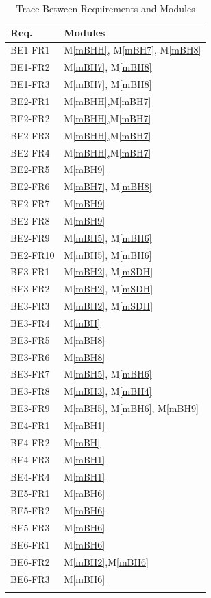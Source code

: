 \documentclass[12pt, titlepage]{article}
\newcommand{\mref}[1]{M\ref{#1}}
\begin{document}
\begin{table}[H]
\centering
\begin{tabular}{p{} p{}}
\toprule
\textbf{Req.} & \textbf{Modules}\\
\midrule
BE1-FR1 &  \mref{mBHH}, \mref{mBH7}, \mref{mBH8}\\
BE1-FR2 & \mref{mBH7}, \mref{mBH8}\\
BE1-FR3 &  \mref{mBH7}, \mref{mBH8}\\
BE2-FR1 & \mref{mBHH},\mref{mBH7}\\
BE2-FR2 & \mref{mBHH},\mref{mBH7}\\
BE2-FR3 & \mref{mBHH},\mref{mBH7}\\
BE2-FR4 & \mref{mBHH},\mref{mBH7}\\
BE2-FR5 & \mref{mBH9}\\
BE2-FR6 & \mref{mBH7}, \mref{mBH8}\\
BE2-FR7 & \mref{mBH9}\\
BE2-FR8 & \mref{mBH9} \\
BE2-FR9 & \mref{mBH5}, \mref{mBH6} \\
BE2-FR10 & \mref{mBH5}, \mref{mBH6} \\
BE3-FR1 & \mref{mBH2}, \mref{mSDH}\\
BE3-FR2 & \mref{mBH2}, \mref{mSDH} \\
BE3-FR3 & \mref{mBH2}, \mref{mSDH} \\
BE3-FR4 & \mref{mBH} \\
BE3-FR5 & \mref{mBH8} \\
BE3-FR6 & \mref{mBH8} \\
BE3-FR7 & \mref{mBH5}, \mref{mBH6}\\
BE3-FR8 & \mref{mBH3}, \mref{mBH4} \\
BE3-FR9 &  \mref{mBH5}, \mref{mBH6}, \mref{mBH9} \\
BE4-FR1 & \mref{mBH1}\\
BE4-FR2 & \mref{mBH}\\
BE4-FR3 & \mref{mBH1}\\
BE4-FR4 & \mref{mBH1}\\
BE5-FR1 & \mref{mBH6}\\
BE5-FR2 & \mref{mBH6}\\
BE5-FR3 & \mref{mBH6}\\
BE6-FR1 & \mref{mBH6}\\
BE6-FR2 & \mref{mBH2},\mref{mBH6}\\
BE6-FR3 & \mref{mBH6}\\\\
\bottomrule
\end{tabular}
\caption{Trace Between Requirements and Modules}
\label{TblRT}
\end{table}
\end{document}
